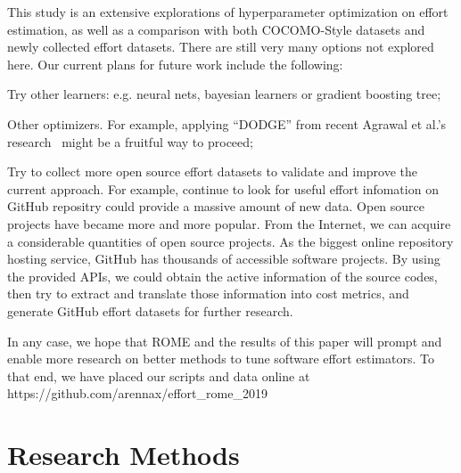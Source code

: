 This study is an extensive explorations of hyperparameter optimization on effort estimation, as well as a comparison with both COCOMO-Style datasets and newly collected effort datasets. There are still very many
options not explored here. Our current
plans for future work include the following:

\bi
\item Try other learners:
e.g. neural nets, bayesian learners or gradient boosting tree;
\item Other optimizers. For example,
applying ``DODGE'' from recent Agrawal et al.'s research~\cite{agrawal2019dodge} might be a fruitful way to proceed;
\item Try to collect more open source effort datasets to validate and improve the current approach. For example, continue to look for useful effort infomation on GitHub repositry could provide a massive amount of new data.
\ei
Open source projects have became more and more popular. From the Internet, we can acquire a considerable quantities of open source projects. As the biggest online repository hosting service, GitHub has thousands of accessible software projects. By using the provided APIs, we could obtain the active information of the source codes, then try to extract and translate those information into cost metrics, and generate GitHub effort datasets for further research.

In any case, we  hope  that ROME  and the results of this paper will  prompt  and  enable
more research on better methods to tune software effort
estimators.
To that end, we have placed our scripts and data online at https://github.com/arennax/effort\_rome\_2019





\appendix

\section{Research Methods}

